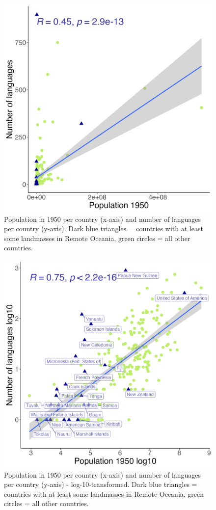 \documentclass[unnumsec,webpdf,modern,medium]{oup-authoring-template}
\begin{document}
\begin{appendices}
\begin{figure}[ht]
    \centering
    \includegraphics[width=.7\textwidth]{number_of_languages_vs_pop_1950.png}
    \caption{Population in 1950 per country (x-axis) and number of languages per country (y-axis). Dark blue triangles = countries with at least some landmasses in Remote Oceania, green circles = all other countries.}
        \label{fig:un_pop_plot}
    \end{figure}
    
\begin{figure}[ht]
    \centering
          \includegraphics[width=.7\textwidth]{number_of_languages_vs_pop_1950_log10.png}
    \caption{Population in 1950 per country (x-axis) and number of languages per country (y-axis) - log-10-transformed. Dark blue triangles = countries with at least some landmasses in Remote Oceania, green circles = all other countries.}
    \label{fig:un_pop_plot_log10}
    \end{figure}


\end{appendices}
\end{document}
